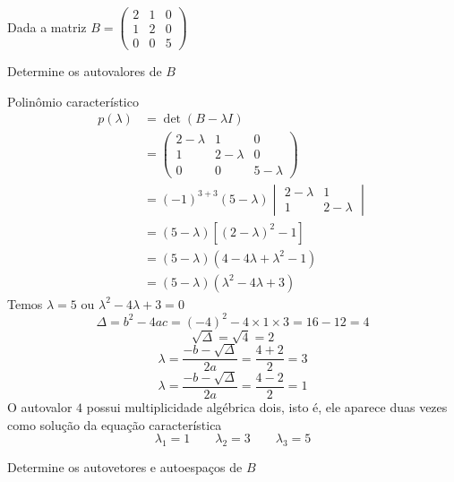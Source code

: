 \documentclass[a4paper,12pt,fleqn]{article}
\begin{document}

\bigskip
Dada a matriz
\(
  B = \begin{pmatrix}
    2 & 1 & 0 \\
    1 & 2 & 0 \\
    0 & 0 & 5
  \end{pmatrix}
\)

Determine os autovalores de $B$

\begin{answer}
  Polinômio característico
  \begin{align*}
    p(\lambda)
    & = \det(B-\lambda I) \\
    & = \begin{pmatrix}
      2 - \lambda & 1           & 0           \\
      1           & 2 - \lambda & 0           \\
      0           & 0           & 5 - \lambda
    \end{pmatrix}
    \\
    & = (-1)^{3+3}(5-\lambda)
        \begin{vmatrix}
          2-\lambda & 1         \\
          1         & 2-\lambda
        \end{vmatrix}\\
    & = (5-\lambda) \left[(2-\lambda)^2-1\right] \\
    & = (5-\lambda)(4-4\lambda +\lambda^2 - 1) \\
    & = (5-\lambda)(\lambda^2 - 4\lambda + 3)
  \end{align*}
  Temos \(\lambda=5\) ou \(\lambda^2 - 4\lambda + 3=0\)
  \[
    \Delta
    = b^2 - 4ac
    = (-4)^2 - 4 \times 1 \times 3
    = 16 - 12
    = 4
  \]
  \[
    \sqrt{\Delta} = \sqrt{4} = 2
  \]
  \[
    \lambda
    = \frac{-b - \sqrt{\Delta}}{2a}
    = \frac{4+2}{2}
    = 3
  \]
  \[
    \lambda
    = \frac{-b - \sqrt{\Delta}}{2a}
    = \frac{4-2}{2}
    = 1
  \]
  O autovalor $4$ possui multiplicidade algébrica dois, isto é,
  ele aparece duas vezes como solução da equação característica
  \[
    \lambda_1 = 1 \qquad
    \lambda_2 = 3 \qquad
    \lambda_3 = 5
  \]
\end{answer}

Determine os autovetores e autoespaços de $B$
\end{document}
